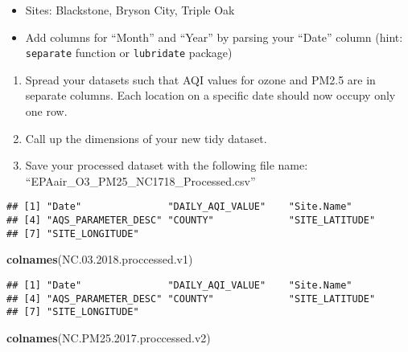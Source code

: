 \documentclass[]{article}
\newenvironment{Shaded}{\begin{snugshade}}{\end{snugshade}}
\newcommand{\KeywordTok}[1]{\textcolor[rgb]{0.13,0.29,0.53}{\textbf{#1}}}
\newcommand{\FloatTok}[1]{\textcolor[rgb]{0.00,0.00,0.81}{#1}}
\newcommand{\CommentTok}[1]{\textcolor[rgb]{0.56,0.35,0.01}{\textit{#1}}}
\newcommand{\NormalTok}[1]{#1}
\providecommand{\tightlist}{%
  \setlength{\itemsep}{0pt}\setlength{\parskip}{0pt}}
\begin{document}
\begin{itemize}
\tightlist
\item
  Sites: Blackstone, Bryson City, Triple Oak
\item
  Add columns for ``Month'' and ``Year'' by parsing your ``Date'' column
  (hint: \texttt{separate} function or \texttt{lubridate} package)
\end{itemize}

\begin{enumerate}
\def\labelenumi{\arabic{enumi}.}
\setcounter{enumi}{8}
\tightlist
\item
  Spread your datasets such that AQI values for ozone and PM2.5 are in
  separate columns. Each location on a specific date should now occupy
  only one row.
\item
  Call up the dimensions of your new tidy dataset.
\item
  Save your processed dataset with the following file name:
  ``EPAair\_O3\_PM25\_NC1718\_Processed.csv''
\end{enumerate}

\begin{Shaded}
\end{Shaded}

\begin{verbatim}
## [1] "Date"               "DAILY_AQI_VALUE"    "Site.Name"         
## [4] "AQS_PARAMETER_DESC" "COUNTY"             "SITE_LATITUDE"     
## [7] "SITE_LONGITUDE"
\end{verbatim}

\begin{Shaded}
\begin{Highlighting}[]
\KeywordTok{colnames}\NormalTok{(NC.}\FloatTok{03.2018}\NormalTok{.proccessed.v1)}
\end{Highlighting}
\end{Shaded}

\begin{verbatim}
## [1] "Date"               "DAILY_AQI_VALUE"    "Site.Name"         
## [4] "AQS_PARAMETER_DESC" "COUNTY"             "SITE_LATITUDE"     
## [7] "SITE_LONGITUDE"
\end{verbatim}

\begin{Shaded}
\begin{Highlighting}[]
\KeywordTok{colnames}\NormalTok{(NC.PM25.}\FloatTok{2017.}\NormalTok{proccessed.v2)}
\end{Highlighting}
\end{Shaded}
\end{document}
